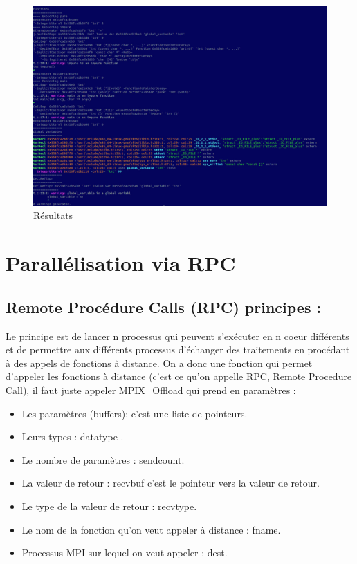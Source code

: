 \documentclass[12pt,a4paper]{article}
\begin{document}
\begin{figure}[H]
\centering
\includegraphics[scale=0.35]{AST.jpg}
\caption[Résultats]{Résultats} 
\end{figure}

\section{Parallélisation via RPC }

\subsection{Remote Procédure Calls (RPC) principes :}
Le principe est de lancer n processus qui peuvent s'exécuter en n coeur différents et de permettre aux différents processus d'échanger des traitements en procédant à des appels de fonctions à distance. On a donc une fonction qui permet d'appeler les fonctions à distance (c'est ce qu'on appelle RPC, Remote Procedure Call), il faut juste appeler MPIX\_Offload qui prend en paramètres :

\begin{itemize}
\item Les paramètres (buffers): c'est une liste de pointeurs.
\item Leurs types : datatype .
\item Le nombre de paramètres : sendcount. 
\item La valeur de retour : recvbuf c'est le pointeur vers la valeur de retour.
\item Le type de la valeur de retour : recvtype.
\item Le nom de la fonction qu'on veut appeler à distance : fname.
\item Processus MPI sur lequel on veut appeler : dest.
\end{itemize}
\end{document}
